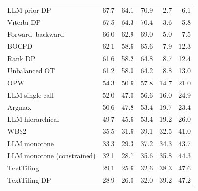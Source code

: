 \begin{table}[t]
\begin{tabular*}{\linewidth}{@{\extracolsep{\fill}}lrrrrr@{}}
LLM-prior DP & 67.7 & 64.1 & 70.9 & 2.7 & 6.1 \\
Viterbi DP & 67.5 & 64.3 & 70.4 & 3.6 & 5.8 \\
Forward--backward & 66.0 & 62.9 & 69.0 & 5.0 & 7.5 \\
BOCPD & 62.1 & 58.6 & 65.6 & 7.9 & 12.3 \\
Rank DP & 61.6 & 58.2 & 64.8 & 8.7 & 12.4 \\
Unbalanced OT & 61.2 & 58.0 & 64.2 & 8.8 & 13.0 \\
OPW & 54.3 & 50.6 & 57.8 & 14.7 & 21.0 \\
LLM single call & 52.0 & 47.0 & 56.6 & 16.0 & 24.9 \\
Argmax & 50.6 & 47.8 & 53.4 & 19.7 & 23.4 \\
LLM hierarchical & 49.7 & 45.6 & 53.4 & 19.2 & 26.0 \\
WBS2 & 35.5 & 31.6 & 39.1 & 32.5 & 41.0 \\
LLM monotone & 33.3 & 29.3 & 37.2 & 34.3 & 43.7 \\
LLM monotone (constrained) & 32.1 & 28.7 & 35.6 & 35.8 & 44.3 \\
TextTiling & 29.1 & 25.6 & 32.6 & 38.3 & 47.6 \\
TextTiling DP & 28.9 & 26.0 & 32.0 & 39.2 & 47.2 \\
\bottomrule
\end{tabular*}
\end{table}
